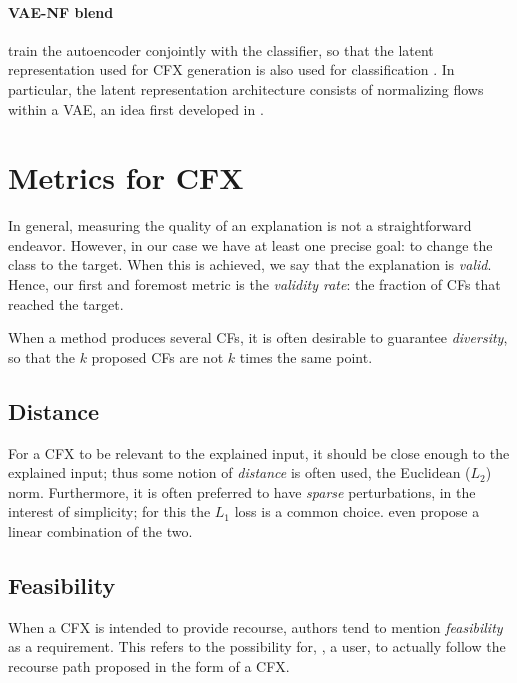 \documentclass[../main.tex]{subfiles}
\begin{document}
\paragraph{VAE-NF blend}

\citeauthor{zhangInterpretable2022} train the autoencoder conjointly with the classifier, so that the latent representation used for CFX generation is also used for classification \cite{zhangInterpretable2022}.
In particular, the latent representation architecture consists of normalizing flows within a VAE, an idea first developed in \cite{rezendeVariational2015}.

\section{Metrics for CFX}

In general, measuring the quality of an explanation is not a straightforward endeavor.
However, in our case we have at least one precise goal: to change the class to the target.
When this is achieved, we say that the explanation is \emph{valid}.
Hence, our first and foremost metric is the \emph{validity rate}: the fraction of CFs that reached the target.

When a method produces several CFs, it is often desirable to guarantee \emph{diversity}, so that the $k$ proposed CFs are not $k$ times the same point.

\subsection{Distance}

For a CFX to be relevant to the explained input, it should be close enough to the explained input; thus some notion of \emph{distance} is often used, \eg{} the Euclidean ($L_2$) norm.
Furthermore, it is often preferred to have \emph{sparse} perturbations, in the interest of simplicity; for this the $L_1$ loss is a common choice. \citenote{}
\citeauthor{vanlooverenInterpretable2021} even propose a linear combination of the two.

\subsection{Feasibility}

When a CFX is intended to provide recourse, authors tend to mention \emph{feasibility} as a requirement.
This refers to the possibility for, \eg{}, a user, to actually follow the recourse path proposed in the form of a CFX.
\end{document}
